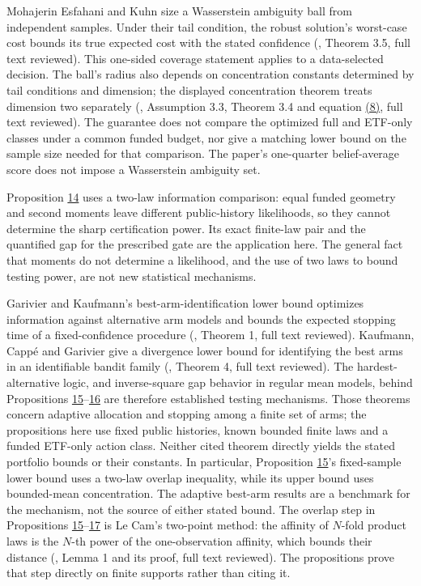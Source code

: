 \documentclass[11pt]{article}
\begin{document}
Mohajerin Esfahani and Kuhn size a Wasserstein ambiguity ball from independent
samples. Under their tail condition, the robust solution's worst-case cost bounds
its true expected cost with the stated confidence
(\cite{esfahani2017data}, Theorem 3.5, full text reviewed). This one-sided
coverage statement applies to a data-selected decision. The ball's radius
also depends on concentration constants determined by tail conditions and
dimension; the displayed concentration theorem treats dimension two separately
(\cite{esfahani2017data}, Assumption 3.3, Theorem 3.4 and equation \hyperref[eq:8]{(8)}, full text
reviewed). The guarantee does not compare the optimized full and ETF-only
classes under a common funded budget, nor give a matching lower bound on
the sample size needed for that comparison. The paper's one-quarter
belief-average score does not impose a Wasserstein ambiguity set.

Proposition \hyperref[res:Proposition-14]{14} uses a two-law information comparison: equal funded
geometry and second moments leave different public-history likelihoods,
so they cannot determine the sharp certification power. Its exact
finite-law pair and the quantified gap for the prescribed gate are
the application here. The general fact that moments do not determine
a likelihood, and the use of two laws to bound testing power, are
not new statistical mechanisms.

Garivier and Kaufmann's best-arm-identification lower bound
optimizes information against alternative arm models and bounds
the expected stopping time of a fixed-confidence procedure
(\cite{garivier2016optimal}, Theorem 1, full text reviewed).
Kaufmann, Cappé and Garivier give a divergence lower bound for
identifying the best arms in an identifiable bandit family
(\cite{kaufmann2014complexity}, Theorem 4, full text reviewed).
The hardest-alternative logic, and inverse-square gap behavior in
regular mean models, behind Propositions \hyperref[res:Proposition-15]{15}--\hyperref[res:Proposition-16]{16} are therefore
established testing mechanisms. Those theorems concern adaptive
allocation and stopping
among a finite set of arms; the propositions here use fixed public
histories, known bounded finite laws and a funded ETF-only action
class. Neither cited theorem directly yields the stated portfolio
bounds or their constants. In particular, Proposition \hyperref[res:Proposition-15]{15}'s
fixed-sample lower bound uses a two-law overlap inequality, while
its upper bound uses bounded-mean concentration. The adaptive
best-arm results are a benchmark for the mechanism, not the source
of either stated bound. The overlap step in Propositions \hyperref[res:Proposition-15]{15}--\hyperref[res:Proposition-17]{17} is
Le Cam's two-point method: the affinity of \(N\)-fold product laws
is the \(N\)-th power of the one-observation affinity, which bounds
their distance (\cite{lecam1973convergence}, Lemma 1 and its proof, full
text reviewed). The propositions prove that step directly on finite
supports rather than citing it.
\end{document}
